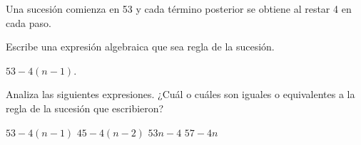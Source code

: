 Una sucesión comienza en 53 y cada término posterior se obtiene al restar 4 en
cada paso.

\begin{parts}
    Escribe una expresión algebraica que sea regla de la sucesión.

    \begin{solutionbox}{1.5cm}
        $53 - 4(n - 1)$.
    \end{solutionbox}

    Analiza las siguientes expresiones. ¿Cuál o cuáles son iguales o equivalentes a la regla de la sucesión que escribieron?

    \begin{checkboxes}
        \CorrectChoice $53 - 4 (n - 1)$
        \choice $45 - 4(n - 2)$
        \choice $53n - 4$
        \CorrectChoice $57 - 4n$
    \end{checkboxes}
\end{parts}